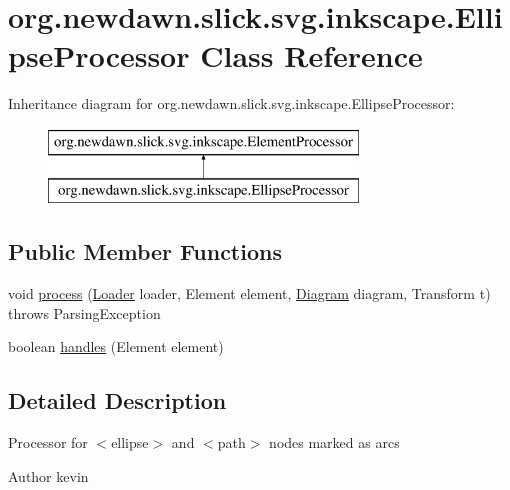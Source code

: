 \hypertarget{classorg_1_1newdawn_1_1slick_1_1svg_1_1inkscape_1_1_ellipse_processor}{}\section{org.\+newdawn.\+slick.\+svg.\+inkscape.\+Ellipse\+Processor Class Reference}
\label{classorg_1_1newdawn_1_1slick_1_1svg_1_1inkscape_1_1_ellipse_processor}
Inheritance diagram for org.\+newdawn.\+slick.\+svg.\+inkscape.\+Ellipse\+Processor\+:\begin{figure}[H]
\begin{center}
\leavevmode
\includegraphics[height=2.000000cm]{classorg_1_1newdawn_1_1slick_1_1svg_1_1inkscape_1_1_ellipse_processor}
\end{center}
\end{figure}
\subsection*{Public Member Functions}
\begin{DoxyCompactItemize}
\item 
void \mbox{\hyperlink{classorg_1_1newdawn_1_1slick_1_1svg_1_1inkscape_1_1_ellipse_processor_aa1d099c3b7ce4be328ccde1a5a2d1fb7}{process}} (\mbox{\hyperlink{interfaceorg_1_1newdawn_1_1slick_1_1svg_1_1_loader}{Loader}} loader, Element element, \mbox{\hyperlink{classorg_1_1newdawn_1_1slick_1_1svg_1_1_diagram}{Diagram}} diagram, Transform t)  throws Parsing\+Exception 
\item 
boolean \mbox{\hyperlink{classorg_1_1newdawn_1_1slick_1_1svg_1_1inkscape_1_1_ellipse_processor_a54a6dbcfc6d01e3fd2bc61aeed789c88}{handles}} (Element element)
\end{DoxyCompactItemize}


\subsection{Detailed Description}
Processor for $<$ellipse$>$ and $<$path$>$ nodes marked as arcs

\begin{DoxyAuthor}{Author}
kevin 
\end{DoxyAuthor}


